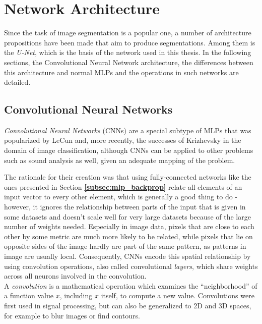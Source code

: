 \chapter {Network Architecture}
\label{chap:network}

Since the task of image segmentation is a popular one, a number of architecture propositions have been made that aim to produce segmentations. Among them is the \textit{U-Net}, which is the basis of the network used in this thesis.  In the following sections, the Convolutional Neural Network architecture, the differences between this architecture and normal MLPs and the operations in such networks are detailed.


	\section{Convolutional Neural Networks}
\label{sec:CNN}
\textit{Convolutional Neural Networks} (CNNs) are a special subtype of MLPs that was popularized by LeCun \cite{lecun98} and, more recently, the successes of Krizhevsky \cite{krizhevsky2012} in the domain of image classification, although CNNs can be applied to other problems such as sound analysis \cite{CNN_sound} as well, given an adequate mapping of the problem. 

The rationale for their creation was that using fully-connected networks like the ones presented in Section \textbf{\ref{subsec:mlp_backprop}} relate all elements of an input vector to every other element, which is generally a good thing to do - however, it ignores the relationship between parts of the input that is given in some datasets and doesn't scale well for very large datasets because of the large number of weights needed. Especially in image data, pixels that are close to each other by some metric are much more likely to be related, while pixels that lie on opposite sides of the image hardly are part of the same pattern, as patterns in image are usually local. Consequently, CNNs encode this spatial relationship by using convolution operations, also called convolutional \textit{layers}, which share weights across all neurons involved in the convolution.\\

\noindent A \textit{convolution} is a mathematical operation which examines the ``neighborhood'' of a function value $x$, including $x$ itself, to compute a new value.  Convolutions were first used in signal processing, but can also be generalized to 2D and 3D spaces, for example to blur images or find contours.

